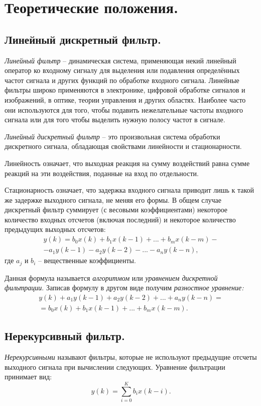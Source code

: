 \documentclass[a4paper,14pt]{extarticle}
\begin{document}
\section{Теоретические положения.}
\subsection{Линейный дискретный фильтр.}
\textit{Линейный фильтр} -- динамическая система, применяющая некий линейный оператор ко входному сигналу для выделения или подавления определённых частот сигнала и других функций по обработке входного сигнала. Линейные фильтры широко применяются в электронике, цифровой обработке сигналов и изображений, в оптике, теории управления и других областях.
Наиболее часто они используются для того, чтобы подавить нежелательные частоты входного сигнала или для того чтобы выделить нужную полосу частот в сигнале.

\textit{Линейный дискретный фильтр} – это произвольная система обработки дискретного сигнала, обладающая свойствами линейности и стационарности.

Линейность означает, что выходная реакция на сумму воздействий
равна сумме реакций на эти воздействия, поданные на вход по отдельности.

Стационарность означает, что задержка входного сигнала приводит
лишь к такой же задержке выходного сигнала, не меняя его формы.
В общем случае дискретный фильтр суммирует (с весовыми коэффициентами) некоторое количество входных отсчетов (включая последний) и
некоторое количество предыдущих выходных отсчетов:
\begin{multline*}
y(k) = b_0 x(k) + b_1 x(k-1) + ... + b_m x(k-m) - \\
- a_1 y(k-1) - a_2 y(k-2) - ... - a_n y(k-n), 
\end{multline*}
где $a_j$ и $b_i$ -- вещественные коэффициенты.

Данная формула называется \textit{алгоритмом} или \textit{уравнением дискретной фильтрации}. Записав формулу в другом виде получим \textit{разностное уравнение:}
\begin{multline*}
y(k) + a_1 y(k-1) + a_2 y(k-2) + ... + a_n y(k-n) = \\
= b_0 x(k) + b_1 x(k-1) + ... + b_m x(k-m).
\end{multline*}

\subsection{Нерекурсивный фильтр.}
\textit{Нерекурсивными} называют фильтры, которые не используют предыдущие отсчеты выходного сигнала при вычислении следующих. Уравнение фильтрации принимает вид:
\begin{equation*}
y(k) = \sum_{i=0}^K b_i x(k-i).
\end{equation*}
\end{document}
